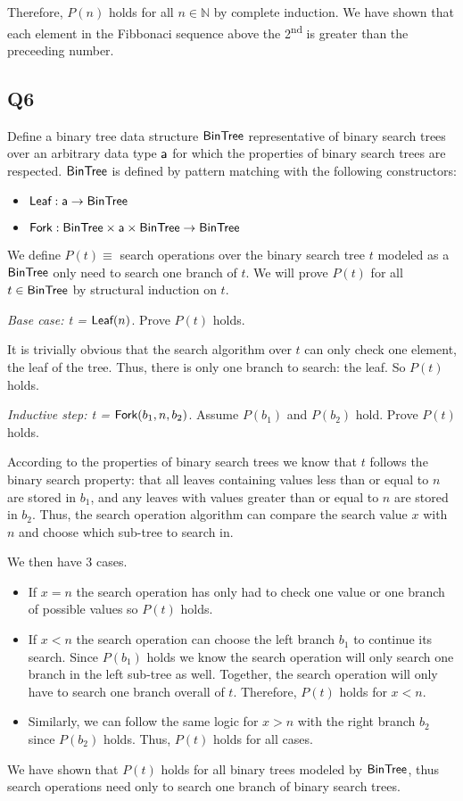 \documentclass[12pt, fleqn]{article}
\newcommand{\mname}[1]{\mbox{\sf #1}}
\begin{document}
\medskip
Therefore, $P(n)$ holds for all $n \in \mathbb{N}$ by complete induction. We have shown that each element in the 
Fibbonaci sequence above the 2\textsuperscript{nd} is greater than the preceeding number.

\subsection{Q6}

Define a binary tree data structure $\mname{BinTree}$ representative of binary search trees over an
arbitrary data type $\mname{a}$ for which the properties of binary search trees are respected.
$\mname{BinTree}$ is defined by pattern matching with the following constructors:
\begin{itemize}
    \item[] $\mname{Leaf}: \mname{a} \rightarrow \mname{BinTree}$
    \item[] $\mname{Fork}: \mname{BinTree} \times \mname{a} \times \mname{BinTree} \rightarrow \mname{BinTree}$
\end{itemize}
We define $P(t) \equiv$ search operations over the binary search tree $t$ modeled as a $\mname{BinTree}$ only need to search one branch of $t$.
We will prove $P(t)$ for all $t \in \mname{BinTree}$ by structural induction on $t$.

\medskip
\emph{Base case: t = $\mname{Leaf}(n)$}. Prove $P(t)$ holds.

\medskip
It is trivially obvious that the search algorithm over $t$ can only check one element, the leaf of the tree. 
Thus, there is only one branch to search: the leaf. So $P(t)$ holds.

\medskip
\emph{Inductive step: t = $\mname{Fork}(b_1, n, b_2)$}. Assume $P(b_1)$ and $P(b_2)$ hold. Prove $P(t)$ holds.

\medskip
According to the properties of binary search trees we know that $t$ follows the binary search property: that all leaves containing
values less than or equal to $n$ are stored in $b_1$, and any leaves with values greater than or equal to $n$ are stored in $b_2$. Thus,
the search operation algorithm can compare the search value $x$ with $n$ and choose which sub-tree to search in.

\medskip
We then have 3 cases.
\begin{itemize}
    \item If $x = n$ the search operation has only had to check one value or one branch of possible
    values so $P(t)$ holds.

    \item  If $x < n$ the search operation can choose the left branch $b_1$ to continue its search. Since $P(b_1)$
    holds we know the search operation will only search one branch in the left sub-tree as well. Together, the search operation will
    only have to search one branch overall of $t$. Therefore, $P(t)$ holds for $x < n$.

    \item Similarly, we can follow the same logic for $x > n$ with the right branch $b_2$
    since $P(b_2)$ holds. Thus, $P(t)$ holds for all cases.
\end{itemize}   

\medskip
We have shown that $P(t)$ holds for all binary trees modeled by $\mname{BinTree}$, thus search operations need only to search one branch
of binary search trees.
\end{document}

